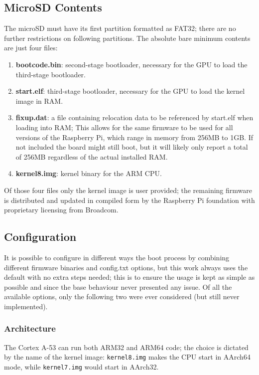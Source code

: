 \documentclass[12pt,a4paper,openright,twoside]{report}
\begin{document}
\subsection{MicroSD Contents}
The microSD must have its first partition formatted as FAT32; there are no 
further restrictions on following partitions. The absolute bare minimum contents 
are just four files:
\begin{enumerate}
    \item \textbf{bootcode.bin}: second-stage bootloader, necessary for the GPU
            to load the third-stage bootloader.
    \item \textbf{start.elf}: third-stage bootloader, necessary for the GPU to load
            the kernel image in RAM.
    \item \textbf{fixup.dat}: a file containing relocation data to be referenced 
            by start.elf when loading into RAM; This allows for the same firmware 
            to be used for all versions of the Raspberry Pi, which range in 
            memory from 256MB to 1GB. If not included the board might still boot,
            but it will likely only report a total of 256MB regardless of the
            actual installed RAM.
    \item \textbf{kernel8.img}: kernel binary for the ARM CPU.
\end{enumerate}
Of those four files only the kernel image is user provided; the remaining firmware
is distributed and updated in compiled form by the Raspberry Pi foundation with
proprietary licensing from Broadcom.

\subsection{Configuration}
It is possible to configure in different ways the boot process by combining
different firmware binaries and config.txt options, but this work always uses
the default with no extra steps needed; this is to ensure the usage is kept
as simple as possible and since the base behaviour never presented any issue.
Of all the available options, only the following two were ever considered 
(but still never implemented).

\subsubsection{Architecture}
The Cortex A-53 can run both ARM32 and ARM64 code; the choice is dictated by the
name of the kernel image: {\tt kernel8.img} makes the CPU start in AArch64 mode,
while {\tt kernel7.img} would start in AArch32.
\end{document}
